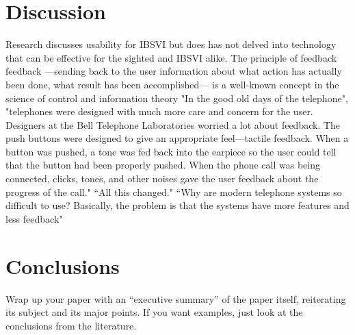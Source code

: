 \documentclass[11pt]{article}
\begin{document}
\section{Discussion}
Research discusses usability for IBSVI but does has not delved into technology that can be effective for the sighted and IBSVI alike.
The principle of feedback
feedback ---sending back to the user information about what action has actually been done, what result has been accomplished--- is a well-known concept in the science of control and information theory\cite{Norman02} "In the good old days of the telephone", "telephones were designed with much more care and concern for the user. Designers at the Bell Telephone Laboratories worried a lot about feedback. The push buttons were designed to give an appropriate feel---tactile feedback. When a button was pushed, a tone was fed back into the earpiece so the user could tell that the button had been properly pushed. When the phone call was being connected, clicks, tones, and other noises gave the user feedback about the progress of the call." ``All this changed." ``Why are modern telephone systems so difficult to use? Basically, the problem is that the systems have more features and less feedback"

\section{Conclusions}


Wrap up your paper with an ``executive summary'' of the paper itself, reiterating its subject and its major points.  If you want examples, just look at the conclusions from the literature.
\clearpage


{}

\end{document}
